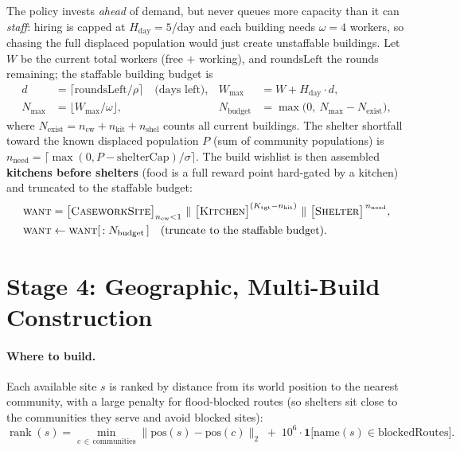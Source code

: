 \documentclass[11pt]{article}
\begin{document}
The policy invests \emph{ahead} of demand, but never queues more capacity than it can \emph{staff}:
hiring is capped at $H_{\text{day}}=5$/day and each building needs $\omega=4$ workers, so chasing
the full displaced population would just create unstaffable buildings. Let $W$ be the current total
workers (free $+$ working), and $\text{roundsLeft}$ the rounds remaining; the staffable building
budget is
\begin{align}
d &= \big\lceil \text{roundsLeft}/\rho \big\rceil \quad\text{(days left)}, &
W_{\max} &= W + H_{\text{day}}\cdot d, \\
N_{\max} &= \big\lfloor W_{\max}/\omega \big\rfloor, &
N_{\text{budget}} &= \max\!\big(0,\ N_{\max} - N_{\text{exist}}\big),
\end{align}
where $N_{\text{exist}} = n_{\text{cw}} + n_{\text{kit}} + n_{\text{shel}}$ counts all current
buildings. The shelter shortfall toward the known displaced population $P$ (sum of community
populations) is $n_{\text{need}} = \big\lceil \max(0, P-\text{shelterCap})/\sigma \big\rceil$.
The build wishlist is then assembled \textbf{kitchens before shelters} (food is a full reward point
hard-gated by a kitchen) and truncated to the staffable budget:
\begin{equation}
\begin{aligned}
\textsc{want} &= \big[\textsc{CaseworkSite}\big]_{n_{\text{cw}}<1} \ \Vert\ \big[\textsc{Kitchen}\big]^{(K_{\text{tgt}}-n_{\text{kit}})} \ \Vert\ \big[\textsc{Shelter}\big]^{\,n_{\text{need}}},\\
\textsc{want} &\leftarrow \textsc{want}[\,:N_{\text{budget}}\,] \quad\text{(truncate to the staffable budget).}
\end{aligned}
\end{equation}

\section{Stage 4: Geographic, Multi-Build Construction}
\label{sec:build}

\paragraph{Where to build.} Each available site $s$ is ranked by distance from its world position
to the nearest community, with a large penalty for flood-blocked routes (so shelters sit close to
the communities they serve and avoid blocked sites):
\begin{equation}
\operatorname{rank}(s) = \min_{c\,\in\,\text{communities}} \lVert \mathrm{pos}(s) - \mathrm{pos}(c)\rVert_2 \;+\; 10^{6}\cdot \mathbf{1}\big[\mathrm{name}(s)\in \text{blockedRoutes}\big].
\end{equation}
\end{document}
